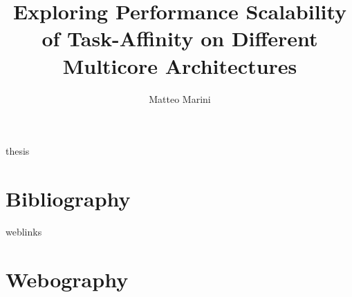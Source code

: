 \documentclass[a4paper,11pt,twoside]{book}
\begin{document}
\title{Exploring Performance Scalability of Task-Affinity on Different Multicore Architectures}
\author{Matteo Marini}



\maketitle

\cleardoublepage

\newpage
{}
\setcounter{tocdepth}{2}
\tableofcontents

\cleardoublepage 
\newpage
{}


\cleardoublepage

\cleardoublepage

\cleardoublepage

\cleardoublepage

\cleardoublepage


\cleardoublepage

%
%
%



\begin{btSect}[phjcp]{thesis}
 \chapter*{Bibliography}
 \btPrintAll
\end{btSect}

\begin{btSect}[phjcp]{weblinks}
 \chapter*{Webography}
 \btPrintAll
\end{btSect}
\end{document}
